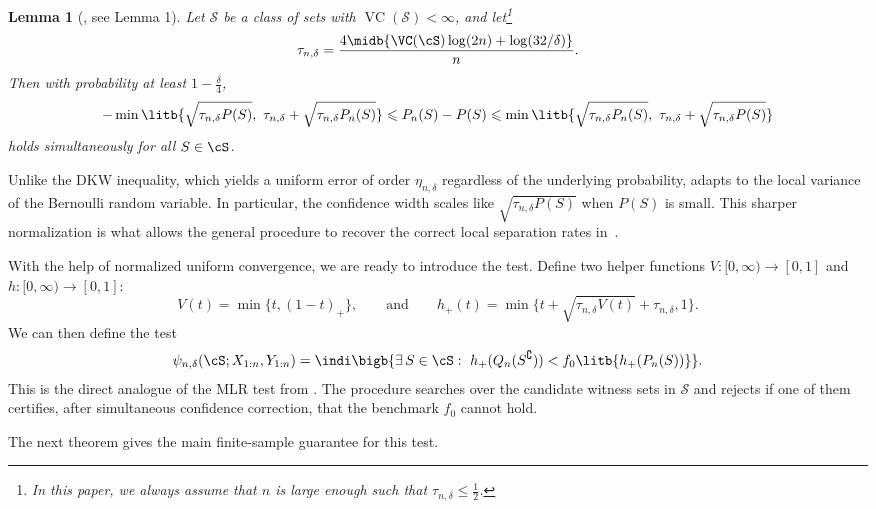 \documentclass[english]{article}
\theoremstyle{plain}
\newtheorem{lemma}{Lemma}[section]
\theoremstyle{definition}
\newcommand{\fnull}{f_0}
\newcommand{\etaND}{\eta_{n,\delta}}               %
\newcommand{\tauND}{\tau_{n,\delta}}               %
\newcommand{\hup}{h_+}                             %
\begin{document}
\begin{lemma}[\cite{vapnik2015uniform}, see \cite{dasgupta2007general} Lemma 1]\label{lem:nuc}
Let $\mathcal S$ be a class of sets with
$\operatorname{VC}(\mathcal S)<\infty$, and let\footnote{In this paper, we always assume that $n$ is large enough such that \(\tauND \leqslant \tfrac{1}{2}\).}
\[
\tauND=\frac{4\midb{\VC(\cS)\log(2n)+\log(32/\delta)}}{n}.
\]
Then with probability at least $1-\frac{\delta}{4}$,
\begin{align*}
-\min\litb{\sqrt{\tauND P(S)},\ \tauND+\sqrt{\tauND P_n(S)}}
\leqslant P_n(S)-P(S)
\leqslant \min\litb{\sqrt{\tauND P_n(S)},\ \tauND+\sqrt{\tauND P(S)}}
\end{align*}
holds simultaneously for all $S\in\cS$.
\end{lemma}

Unlike the DKW inequality, which yields a uniform error of order \(\etaND\)
regardless of the underlying probability,  adapts to the
local variance of the Bernoulli random variable. In particular, the confidence
width scales like \(\sqrt{\tau_{n,\delta}P(S)}\) when \(P(S)\) is small. This
sharper normalization is what allows the general procedure to recover the
correct local separation rates in~.

With the help of normalized uniform convergence, we are ready to introduce the test. Define two helper functions $V: [0,\infty) \to [0,1]$ and $h: [0,\infty) \to [0,1]$: 
\[
V(t)=\min\{t, (1-t)_+\},
\qquad \text{and} \qquad
\hup(t)= \min \{ t+\sqrt{\tau_{n,\delta}V(t)}+\tau_{n,\delta},1\}.
\]
We can then define the test
\begin{align}\label{eq:general-test}
\psi_{n,\delta}(\cS;X_{1:n},Y_{1:n})
=
\indi\bigb{\exists\, S\in\cS:\ \hup(Q_n(S^\complement))< \fnull\litb{\hup(P_n(S))}}.
\end{align}
This is the direct analogue of the MLR test from
. The procedure searches over the candidate witness sets in
\(\mathcal S\) and rejects if one of them certifies, after simultaneous
confidence correction, that the benchmark \(\fnull\) cannot hold.

The next theorem gives the main finite-sample guarantee for this test.
\end{document}
